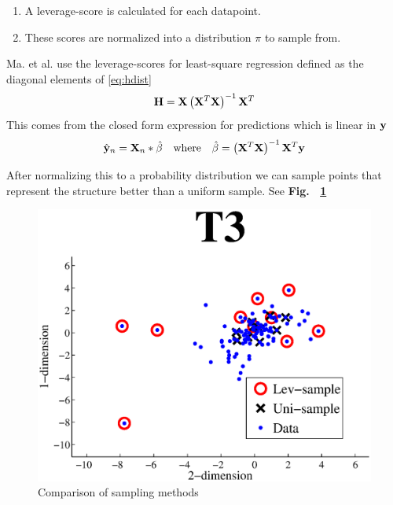 \documentclass{article}
\begin{document}
\begin{enumerate}
\item A leverage-score is calculated for each datapoint.
\item These scores are normalized into a distribution $\pi$ to sample from.
\end{enumerate}

Ma. et al. \cite{Ma} use the leverage-scores for least-square regression defined as the diagonal elements of \eqref{eq:hdist}
\begin{equation}
{\bf H} = {\bf X} \left( {\bf X}^T {\bf X} \right)^{-1} {\bf X}^T
 \label{eq:hdist}
\end{equation}
This comes from the closed form expression for predictions which is linear in ${\bf y}$
\begin{equation*}
	\hat{{\bf y}}_n = {\bf X}_n*\hat{\beta} \quad \text{where} \quad \hat{\beta} = \left( {\bf X}^T {\bf X} \right)^{-1} {\bf X}^T {\bf y} 
\end{equation*}

After normalizing this to a probability distribution we can sample  points that represent the structure better than a uniform sample. See {\bf Fig.~ \ref{fig:selection}}

\begin{figure}[t]
	\centering
    \includegraphics[width=.6\linewidth]{images/selection.eps}
    \caption{Comparison of sampling methods}
    \label{fig:selection}
\end{figure}
\end{document}
